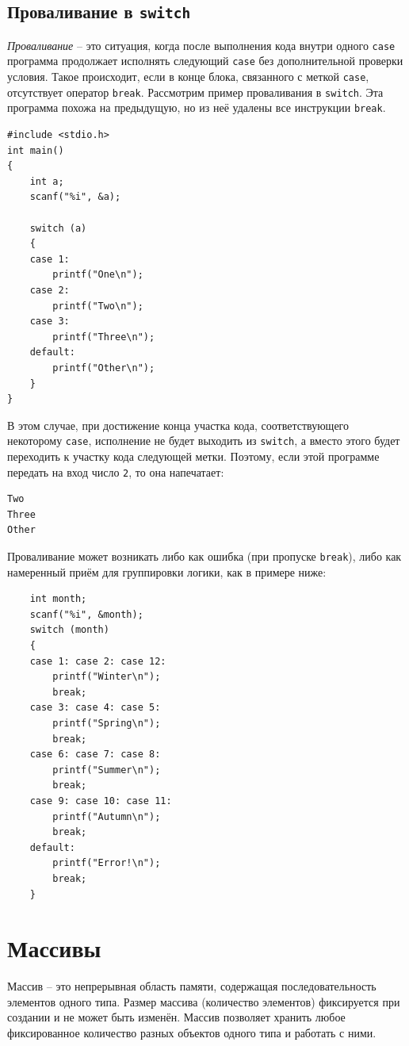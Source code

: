 \documentclass{article}
\begin{document}
\subsection*{Проваливание в \texttt{switch}}
\textit{Проваливание} -- это ситуация, когда после выполнения кода внутри одного \texttt{case} программа продолжает исполнять следующий \texttt{case} без дополнительной проверки условия. Такое происходит, если в конце блока, связанного с меткой \texttt{case}, отсутствует оператор \texttt{break}.
Рассмотрим пример проваливания в \texttt{switch}. Эта программа похожа на предыдущую, но из неё удалены все инструкции \texttt{break}.
\begin{lstlisting}
#include <stdio.h>
int main() 
{
    int a;
    scanf("%i", &a);

    switch (a) 
    {
    case 1:
		printf("One\n");
	case 2:
		printf("Two\n");
	case 3:
  		printf("Three\n");
	default:
		printf("Other\n");
    }
}
\end{lstlisting}
В этом случае, при достижение конца участка кода, соответствующего некоторому \texttt{case}, исполнение не будет выходить из \texttt{switch}, а вместо этого будет переходить к участку кода следующей метки. Поэтому, если этой программе передать на вход число \texttt{2}, то она напечатает:
\begin{verbatim}
Two
Three
Other
\end{verbatim}
Проваливание может возникать либо как ошибка (при пропуске \texttt{break}), либо как намеренный приём для группировки логики, как в примере ниже:
\begin{lstlisting}
    int month;
    scanf("%i", &month);
    switch (month)
    {
    case 1: case 2: case 12:
    	printf("Winter\n");
    	break;
    case 3: case 4: case 5:
    	printf("Spring\n");
    	break;
    case 6: case 7: case 8:
    	printf("Summer\n");
    	break;
    case 9: case 10: case 11:
    	printf("Autumn\n");
    	break;
    default:
        printf("Error!\n");
        break;
    }
\end{lstlisting}


\newpage
\section*{Массивы}
Массив -- это непрерывная область памяти, содержащая последовательность элементов одного типа. Размер массива (количество элементов) фиксируется при создании и не может быть изменён. Массив позволяет хранить любое фиксированное количество разных объектов одного типа и работать с ними.
\end{document}
